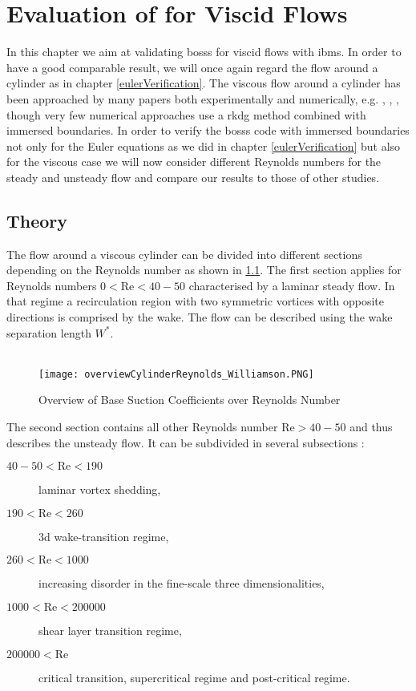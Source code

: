 \chapter{Evaluation of  for Viscid Flows}
\label{viscousCylinder}
In this chapter we aim at validating \gls{bosss} for viscid flows with \gls{ibm}s. In order to have a good comparable result, we will once again regard the flow around a cylinder as in chapter \cref{eulerVerification}. 
The viscous flow around a cylinder has been approached by many papers both experimentally and numerically, e.g. \cite{williamson1996vortex}, \cite{FLM:14223}, \cite{canutoTaira}, though very few numerical approaches use a \gls{rkdg} method combined with immersed boundaries. In order to verify the \gls{bosss} code with immersed boundaries not only for the Euler equations as we did in chapter \cref{eulerVerification} but also for the viscous case we will now consider different Reynolds numbers for the steady and unsteady flow and compare our results to those of other studies.

\section{Theory}
	The flow around a viscous cylinder can be divided into different sections depending on the Reynolds number as shown in \cref{fig:overview}. The first section applies for Reynolds numbers $0 < \text{Re} < 40-50$ characterised by a laminar steady flow. In that regime a recirculation region with two symmetric vortices with opposite directions is comprised by the wake. The flow can be described using the wake separation length $W^*$.\\\\
	\begin{figure}[htp]
		\centering
		\texttt{[image: overviewCylinderReynolds\_Williamson.PNG]}
		\caption{Overview of Base Suction Coefficients over Reynolds Number \cite{williamson1996vortex}}
		\label{fig:overview}
	\end{figure} 
	The second section contains all other Reynolds number $\text{Re}> 40-50$ and thus describes the unsteady flow. It can be subdivided in several subsections \cite{williamson1996vortex}:
	\begin{description}
		\item[$40-50 < \text{Re} < 190$] laminar vortex shedding,
		\item[$190 < \text{Re} < 260$] \gls{3d} wake-transition regime,
		\item[$260 < \text{Re} < 1000$] increasing disorder in the fine-scale three dimensionalities,
		\item[$1000 < \text{Re} < 200000$] shear layer transition regime,
		\item[$200000 < \text{Re}$] critical transition, supercritical regime and post-critical regime.
	\end{description}
	
